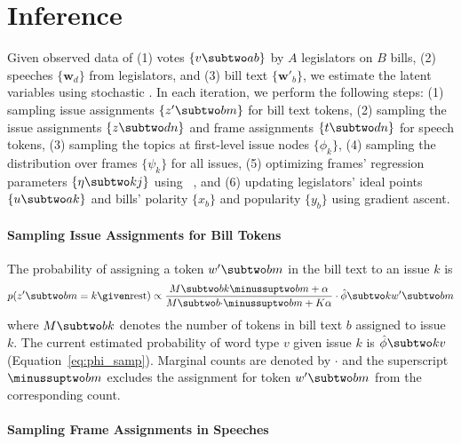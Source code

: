 
\section{Inference}
\label{sec:c6_inference}



Given observed data of (1) votes $\{v \subtwo ab\}$ by $A$ legislators
on $B$ bills, (2) speeches $\{\bm w_d\}$ from legislators, and
(3) bill text $\{\bm w'_b\}$, we estimate the latent variables using stochastic
. In each iteration, we perform the following steps: (1) sampling issue assignments
$\{z' \subtwo bm\}$ for bill text tokens, (2) sampling the
issue assignments $\{z \subtwo dn\}$ and frame assignments $\{t
\subtwo dn\}$ for speech tokens, (3) sampling the topics at
first-level issue nodes $\{\phi_k\}$, (4) sampling the distribution
over frames $\{\psi_k\}$ for all issues, (5) optimizing frames'
regression parameters $\{\eta \subtwo kj\}$ using
~\cite{Liu:MP89:lbfgs}, and (6) updating legislators' ideal points $\{u \subtwo ak\}$ and bills'
polarity $\{x_b\}$ and popularity $\{y_b\}$ using gradient ascent.

\paragraph{Sampling Issue Assignments for Bill Tokens}
\label{subsec:c6_sample_zprime}

The probability of assigning a token $w' \subtwo bm$ in the bill text
to an issue $k$ is
\begin{equation}
  p(z' \subtwo bm = k \given \mbox{rest}) \propto
  \frac{M \subtwo bk \minussuptwo bm + \alpha}{M \subtwo b{\cdot} \minussuptwo bm + K \alpha} \cdot
  \hat{\phi} \subtwo k{w' \subtwo bm}
\end{equation}
where $M \subtwo bk$ denotes the number of tokens in bill text $b$
assigned to issue $k$.  The current estimated probability of
word type $v$ given issue $k$ is $\hat{\phi} \subtwo kv$
(Equation~\ref{eq:phi_samp}). Marginal counts are denoted by $\cdot$
and the superscript $\minussuptwo bm$ excludes the assignment for
token $w' \subtwo bm$ from the corresponding count.

\paragraph{Sampling Frame Assignments in Speeches}
\label{subsec:c6_sample_zt}


